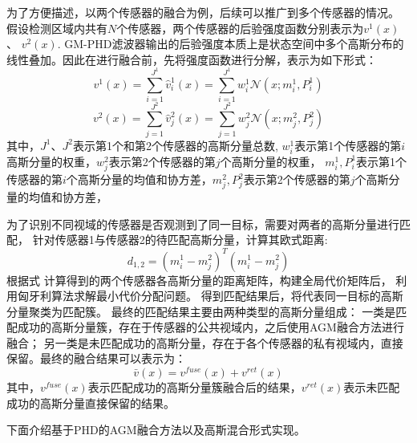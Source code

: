 为了方便描述，以两个传感器的融合为例，后续可以推广到多个传感器的情况。
假设检测区域内共有$N$个传感器，两个传感器的后验强度函数分别表示为$v^{1}\left(x\right)$、
$v^{2}\left(x\right)$.
GM-PHD滤波器输出的后验强度本质上是状态空间中多个高斯分布的线性叠加。因此在进行融合前，先将强度函数进行分解，表示为如下形式：
\begin{equation}
    v^{1}\left(x\right)=\sum_{i=1}^{J^{1}}\hat{v}_{i}^{1}\left(x\right)=\sum_{i=1}^{J^{1}}w_{i}^1\mathcal{N}(x;m_{i}^1,P_{i}^1)
\end{equation}
\begin{equation}
    v^{2}\left(x\right)=\sum_{j=1}^{J^{2}}\hat{v}_{j}^{2}\left(x\right)=\sum_{j=1}^{J^{2}}w_{j}^2\mathcal{N}(x;m_{j}^2,P_{j}^2)
\end{equation}
其中，$J^{1}$、$J^{2}$表示第1个和第2个传感器的高斯分量总数,
$w_{i}^1$表示第1个传感器的第$i$高斯分量的权重，$w_{j}^2$表示第2个传感器的第$j$个高斯分量的权重，
$m_{i}^1,P_{i}^1$表示第1个传感器的第$i$个高斯分量的均值和协方差，$m_{j}^2,P_{j}^2$表示第2个传感器的第$j$个高斯分量的均值和协方差，

为了识别不同视域的传感器是否观测到了同一目标，需要对两者的高斯分量进行匹配，
针对传感器1与传感器2的待匹配高斯分量，计算其欧式距离:
\begin{equation}
d_{1,2} = (m_{i}^1 - m_{j}^2)^T(m_{i}^1 - m_{j}^2)
\label{eq:欧式距离}
\end{equation}
根据式  计算得到的两个传感器各高斯分量的距离矩阵，构建全局代价矩阵后，
利用匈牙利算法求解最小代价分配问题。
得到匹配结果后，将代表同一目标的高斯分量聚类为匹配簇。
最终的匹配结果主要由两种类型的高斯分量组成：
一类是匹配成功的高斯分量簇，存在于传感器的公共视域内，之后使用AGM融合方法进行融合；
另一类是未匹配成功的高斯分量，存在于各个传感器的私有视域内，直接保留。最终的融合结果可以表示为：
\begin{equation}
\bar{v}(x) = v^{fuse}(x) + v^{ret}(x)
\end{equation}
其中，$v^{fuse}(x)$表示匹配成功的高斯分量簇融合后的结果，$v^{ret}(x)$表示未匹配成功的高斯分量直接保留的结果。

下面介绍基于PHD的AGM融合方法以及高斯混合形式实现。

